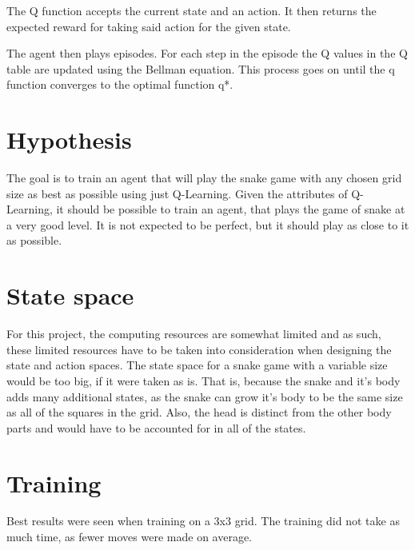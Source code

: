 \documentclass[lettersize,journal]{IEEEtran}
\begin{document}
The Q function accepts the current state and an action. It then
returns the expected reward for taking said action for the given
state.

The agent then plays episodes. For each step in the episode
the Q values in the Q table are updated using the Bellman
equation. This process goes on until the q function converges
to the optimal function q*.

\section{Hypothesis}
The goal is to train an agent that will play the snake game
with any chosen grid size as best as possible using just Q-Learning.
Given the attributes of Q-Learning, it should be possible to train
an agent, that plays the game of snake at a very good level. It
is not expected to be perfect, but it should play as close to it
as possible.






\section{State space}
For this project, the computing resources are somewhat limited and
as such, these limited resources have to be taken into consideration
when designing the state and action spaces.
The state space for a snake game with a variable size would be
too big, if it were taken as is. That is, because the snake and
it's body adds many additional states, as the snake can grow it's body to
be the same size as all of the squares in the grid. Also, the head is distinct
from the other body parts and would have to be accounted for in all of the states.


\section{Training}
Best results were seen when training on a 3x3 grid.
The training did not take as much time, as fewer moves
were made on average.


\end{document}
